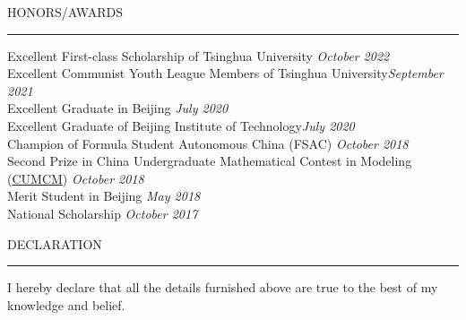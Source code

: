 \documentclass{resume} %
\renewenvironment{rSection}[1]{
\sectionskip
\textcolor{TsinghuaPurple}{\MakeUppercase{#1}}
\sectionlineskip
\hrule
\begin{list}{}{
\setlength{\leftmargin}{0em}
}
\item[]
}{
\end{list}
}
\begin{document}
 
  






\begin{rSection}{Honors/Awards} \itemsep -2pt
{Excellent First-class Scholarship of Tsinghua University }\hfill {\em October 2022} \\
{Excellent Communist Youth League Members of Tsinghua University}\hfill {\em September 2021} \\
{Excellent Graduate in Beijing} \hfill {\em July 2020} \\
{Excellent Graduate of Beijing Institute of Technology}\hfill {\em July 2020}\\
{Champion of Formula Student Autonomous China (FSAC) }\hfill {\em October 2018}\\
{Second Prize in China Undergraduate Mathematical Contest in Modeling (\href{http://en.mcm.edu.cn/}{CUMCM})} \hfill {\em October 2018} \\
{Merit Student in Beijing} \hfill{\em May 2018}\\
{National Scholarship} \hfill{\em October 2017}
\end{rSection}



\begin{rSection}{ Declaration  } \itemsep -3pt        

\item I hereby declare that all the details furnished above are true to the best of my knowledge and belief.   
  
\end{rSection}
\end{document}
